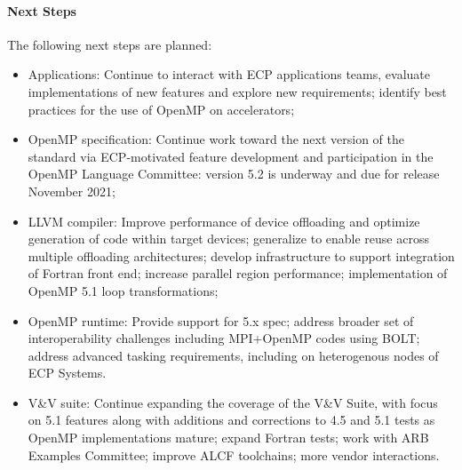 
\paragraph{Next Steps}
The following next steps are planned:
\begin{itemize}
\item Applications: Continue to interact with ECP applications teams, evaluate implementations of new features and explore new requirements; identify best practices for the use of OpenMP on accelerators;

\item OpenMP specification: Continue work toward the next version of the standard via ECP-motivated feature development and participation in the OpenMP Language Committee: version 5.2 is underway and due for release November 2021;

\item LLVM compiler: Improve performance of device offloading and optimize generation of code within target devices; generalize to enable reuse across multiple offloading architectures; develop infrastructure to support integration of Fortran front end; increase parallel region performance; implementation of OpenMP 5.1 loop transformations;

\item OpenMP runtime: Provide support for 5.x spec; address broader set of interoperability challenges including MPI+OpenMP codes using BOLT; address advanced tasking requirements, including on heterogenous nodes of ECP Systems.

\item V\&V suite: Continue expanding the coverage of the V\&V Suite, with focus on 5.1 features along with additions and corrections to 4.5 and 5.1 tests as OpenMP implementations mature; expand Fortran tests; work with ARB Examples Committee; improve ALCF toolchains; more vendor interactions.
\end{itemize} 


